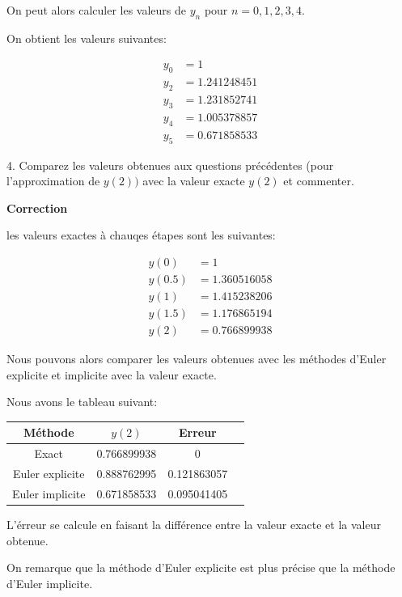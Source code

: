 \documentclass{article}
\newcommand{\correction}[0]{
    \vspace{1mm}
    \textbf{Correction}
    \hrulefill
}
\begin{document}
On peut alors calculer les valeurs de $y_n$ pour $n = 0, 1, 2, 3, 4$.

On obtient les valeurs suivantes:

\begin{align*}
    y_0 &= 1 \\
    y_2 &= 1.241248451 \\
    y_3 &= 1.231852741 \\
    y_4 &= 1.005378857 \\
    y_5 &= 0.671858533
\end{align*}


\hrulefill

4. Comparez les valeurs obtenues aux questions précédentes (pour l'approximation de
$y(2))$ avec la valeur exacte $y(2)$ et commenter.

\correction

les valeurs exactes à chauqes étapes sont les suivantes:

\begin{align*}
    y(0) &= 1 \\
    y(0.5) &= 1.360516058 \\
    y(1) &= 1.415238206 \\
    y(1.5) &= 1.176865194 \\
    y(2) &= 0.766899938
\end{align*}

Nous pouvons alors comparer les valeurs obtenues avec les méthodes d'Euler explicite et implicite avec la valeur exacte.

Nous avons le tableau suivant:

\begin{center}
\begin{tabular}{|c|c|c|c|}
    \hline
    Méthode & $y(2)$ & Erreur \\
    \hline
    Exact & 0.766899938 & 0 \\
    Euler explicite & 0.888762995 & 0.121863057 \\
    Euler implicite & 0.671858533 & 0.095041405 \\
    \hline
\end{tabular}
\end{center}

L'érreur se calcule en faisant la différence entre la valeur exacte et la valeur obtenue.

On remarque que la méthode d'Euler explicite est plus précise que la méthode d'Euler implicite.

\hrulefill
\end{document}

